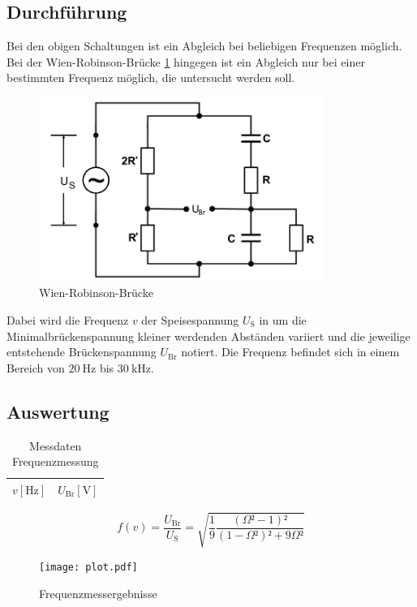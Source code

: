 \subsection{Durchführung}
Bei den obigen Schaltungen ist ein Abgleich bei beliebigen Frequenzen möglich.
Bei der Wien-Robinson-Brücke \ref{fig:5} hingegen ist ein Abgleich nur bei einer bestimmten Frequenz möglich, die untersucht werden soll.
\begin{figure}[H]
  \centering
  \includegraphics[height=6cm]{wien.png}
  \caption{Wien-Robinson-Brücke \cite{sample}}
  \label{fig:5}
\end{figure}
Dabei wird die Frequenz $v$ der Speisespannung $U_{\text{S}}$ in um die Minimalbrückenspannung kleiner werdenden Abständen variiert und die jeweilige entstehende Brückenspannung $U_{\text{Br}}$ notiert.
Die Frequenz befindet sich in einem Bereich von $\SI{20}{\hertz}$ bis $\SI{30}{\kilo\hertz}$.
\subsection{Auswertung}
\begin{table}
  \centering
  \caption{Messdaten Frequenzmessung}
  \label{tab:8}
  \begin{tabular}{c c}
    \toprule
    {$v [\si{\hertz}]$} & {$U_{\text{Br}} [\si{\volt}]$} \\
    \midrule
    
    \bottomrule
  \end{tabular}
\end{table}

\begin{equation}
  f(v) = \frac{U_{\text{Br}}}{U_{\text{S}}} = \sqrt{\frac{1}{9} \frac{\left(\Omega²-1 \right)²}{\left(1-\Omega² \right)²+9\Omega²}}
\end{equation}


\begin{figure}[H]
  \centering
  \texttt{[image: plot.pdf]}
  \caption{Frequenzmessergebnisse}
  \label{fig:6}
\end{figure}
